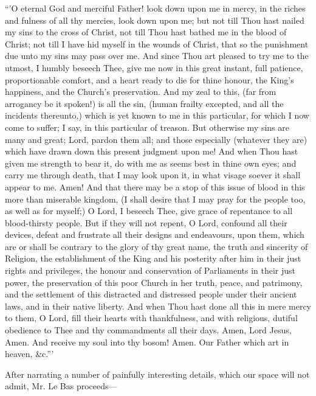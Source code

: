 ``'O eternal God and merciful Father!
look down upon me in mercy, in the riches and fulness of all thy
mercies, look down upon me; but not till Thou hast nailed my sins to the
cross of Christ, not till Thou hast bathed me in the blood of Christ;
not till I have hid myself in the wounds of Christ, that so the
punishment due unto my sins may pass over me. And since Thou art pleased
to try me to the utmost, I humbly beseech Thee, give me now in this
great instant, full patience, proportionable comfort, and a heart ready
to die for thine honour, the King's happiness, and the Church's
preservation. And my zeal to this, (far from arrogancy be it spoken!) is
all the sin, (human frailty excepted, and all
the incidents thereunto,) which is yet known to me in this particular,
for which I now come to suffer; I say, in this particular of treason.
But otherwise my sins are many and great; Lord, pardon them all; and
those especially (whatever they are) which have drawn down this present
judgment upon me! And when Thou hast given me strength to bear it, do
with me as seems best in thine own eyes; and carry me through death,
that I may look upon it, in what visage soever it shall appear to me.
Amen! And that there may be a stop of this issue of blood in this more
than miserable kingdom, (I shall desire that I may pray for the people
too, as well as for myself;) O Lord, I beseech Thee, give grace of
repentance to all blood-thirsty people. But if they will not repent, O
Lord, confound all their devices, defeat and frustrate all their designs
and endeavours, upon them, which are or shall be contrary to the glory
of thy great name, the truth and sincerity of Religion, the
establishment of the King and his posterity after him in their just
rights and privileges, the honour and conservation of Parliaments in
their just power, the preservation of this poor Church in her truth,
peace, and patrimony, and the settlement of this distracted and
distressed people under their ancient laws, and in their native liberty.
And when Thou hast done all this in mere mercy to them, O Lord, fill
their hearts with thankfulness, and with religious, dutiful obedience to
Thee and thy commandments all their days. Amen, Lord Jesus, Amen. And
receive my soul into thy bosom! Amen. Our Father which art in heaven,
\&c.'''

After narrating a number of painfully interesting
details, which our space will not admit, Mr. Le Bas proceeds—

